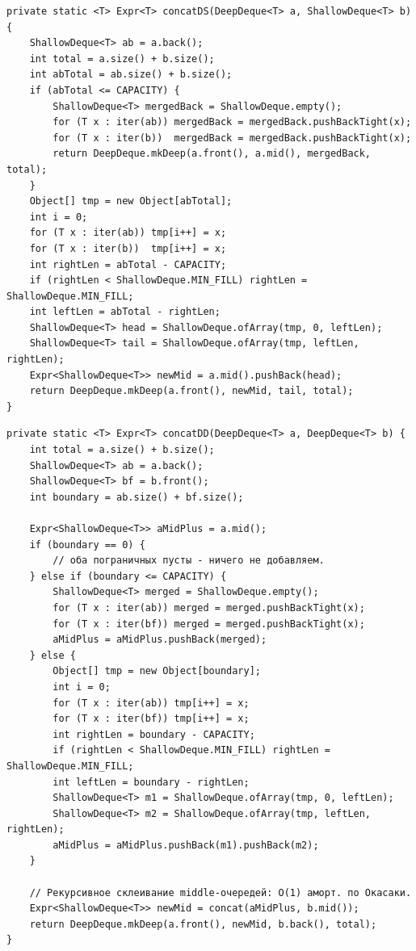 \begin{longlisting}
\caption{concatDS: DeepDeque + ShallowDeque}\label{lst:concat-ds}
\begin{verbatim}
private static <T> Expr<T> concatDS(DeepDeque<T> a, ShallowDeque<T> b) {
    ShallowDeque<T> ab = a.back();
    int total = a.size() + b.size();
    int abTotal = ab.size() + b.size();
    if (abTotal <= CAPACITY) {
        ShallowDeque<T> mergedBack = ShallowDeque.empty();
        for (T x : iter(ab)) mergedBack = mergedBack.pushBackTight(x);
        for (T x : iter(b))  mergedBack = mergedBack.pushBackTight(x);
        return DeepDeque.mkDeep(a.front(), a.mid(), mergedBack, total);
    }
    Object[] tmp = new Object[abTotal];
    int i = 0;
    for (T x : iter(ab)) tmp[i++] = x;
    for (T x : iter(b))  tmp[i++] = x;
    int rightLen = abTotal - CAPACITY;
    if (rightLen < ShallowDeque.MIN_FILL) rightLen = ShallowDeque.MIN_FILL;
    int leftLen = abTotal - rightLen;
    ShallowDeque<T> head = ShallowDeque.ofArray(tmp, 0, leftLen);
    ShallowDeque<T> tail = ShallowDeque.ofArray(tmp, leftLen, rightLen);
    Expr<ShallowDeque<T>> newMid = a.mid().pushBack(head);
    return DeepDeque.mkDeep(a.front(), newMid, tail, total);
}
\end{verbatim}
\end{longlisting}

\begin{longlisting}
\caption{concatDD: два DeepDeque --- ключевой случай O(1) аморт.}\label{lst:concat-dd}
\begin{verbatim}
private static <T> Expr<T> concatDD(DeepDeque<T> a, DeepDeque<T> b) {
    int total = a.size() + b.size();
    ShallowDeque<T> ab = a.back();
    ShallowDeque<T> bf = b.front();
    int boundary = ab.size() + bf.size();

    Expr<ShallowDeque<T>> aMidPlus = a.mid();
    if (boundary == 0) {
        // оба пограничных пусты - ничего не добавляем.
    } else if (boundary <= CAPACITY) {
        ShallowDeque<T> merged = ShallowDeque.empty();
        for (T x : iter(ab)) merged = merged.pushBackTight(x);
        for (T x : iter(bf)) merged = merged.pushBackTight(x);
        aMidPlus = aMidPlus.pushBack(merged);
    } else {
        Object[] tmp = new Object[boundary];
        int i = 0;
        for (T x : iter(ab)) tmp[i++] = x;
        for (T x : iter(bf)) tmp[i++] = x;
        int rightLen = boundary - CAPACITY;
        if (rightLen < ShallowDeque.MIN_FILL) rightLen = ShallowDeque.MIN_FILL;
        int leftLen = boundary - rightLen;
        ShallowDeque<T> m1 = ShallowDeque.ofArray(tmp, 0, leftLen);
        ShallowDeque<T> m2 = ShallowDeque.ofArray(tmp, leftLen, rightLen);
        aMidPlus = aMidPlus.pushBack(m1).pushBack(m2);
    }

    // Рекурсивное склеивание middle-очередей: O(1) аморт. по Окасаки.
    Expr<ShallowDeque<T>> newMid = concat(aMidPlus, b.mid());
    return DeepDeque.mkDeep(a.front(), newMid, b.back(), total);
}
\end{verbatim}
\end{longlisting}
